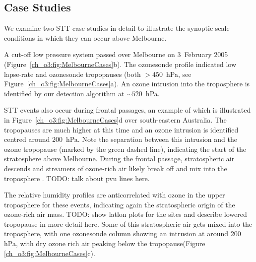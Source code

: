   \subsection{Case Studies}
    We examine two STT case studies in detail to illustrate the synoptic scale conditions in which they can occur above Melbourne.

    A cut-off low pressure system passed over Melbourne on 3~February 2005 (Figure~\ref{ch_o3:fig:MelbourneCases}b).
    The ozonesonde profile indicated low lapse-rate and ozonesonde tropopauses (both $> 450$~hPa, see Figure~\ref{ch_o3:fig:MelbourneCases}a). 
    An ozone intrusion into the troposphere is identified by our detection algorithm at $\sim520$~hPa.

    STT events also occur during frontal passages, an example of which is illustrated in Figure~\ref{ch_o3:fig:MelbourneCases}d over south-eastern Australia.
    The tropopauses are much higher at this time and an ozone intrusion is identified centred around 200~hPa.
    Note the separation between this intrusion and the ozone tropopause (marked by the green dashed line), indicating the start of the stratosphere above Melbourne.
    During the frontal passage, stratospheric air descends and streamers of ozone-rich air likely break off and mix into the troposphere \citep{Sprenger2003}.
    TODO: talk about pvu lines here.

    The relative humidity profiles are anticorrelated with ozone in the upper troposphere for these events, indicating again the stratospheric origin of the ozone-rich air mass.
    TODO: show latlon plots for the sites and describe lowered tropopause in more detail here.
    Some of this stratospheric air gets mixed into the troposphere, with one ozonesonde column showing an intrusion at around 200 hPa, with dry ozone rich air peaking below the tropopause(Figure \ref{ch_o3:fig:MelbourneCases}c).
    
